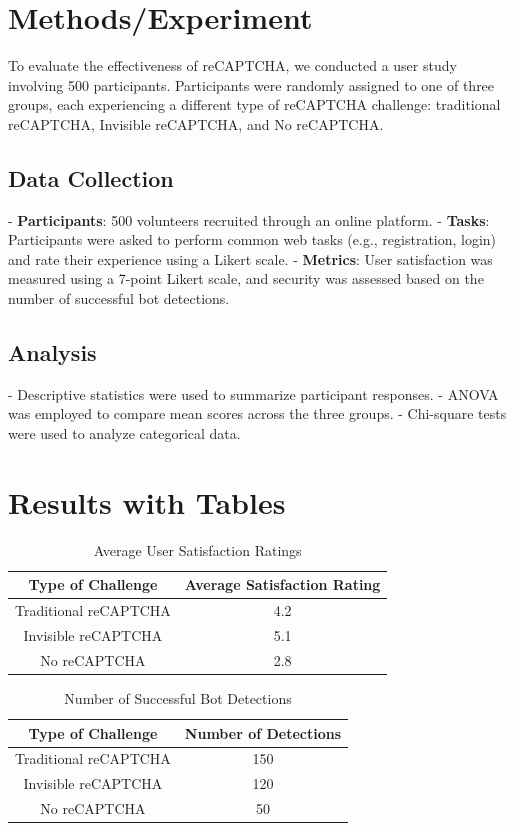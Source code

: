 \section{Methods/Experiment}
To evaluate the effectiveness of reCAPTCHA, we conducted a user study involving 500 participants. Participants were randomly assigned to one of three groups, each experiencing a different type of reCAPTCHA challenge: traditional reCAPTCHA, Invisible reCAPTCHA, and No reCAPTCHA.

\subsection{Data Collection}
- \textbf{Participants}: 500 volunteers recruited through an online platform.
- \textbf{Tasks}: Participants were asked to perform common web tasks (e.g., registration, login) and rate their experience using a Likert scale.
- \textbf{Metrics}: User satisfaction was measured using a 7-point Likert scale, and security was assessed based on the number of successful bot detections.

\subsection{Analysis}
- Descriptive statistics were used to summarize participant responses.
- ANOVA was employed to compare mean scores across the three groups.
- Chi-square tests were used to analyze categorical data.

\section{Results with Tables}
\begin{table}[H]
\centering
\caption{Average User Satisfaction Ratings}
\label{tab:satisfaction}
\begin{tabular}{|c|c|}
\hline
Type of Challenge & Average Satisfaction Rating \\
\hline
Traditional reCAPTCHA & 4.2 \\
Invisible reCAPTCHA & 5.1 \\
No reCAPTCHA & 2.8 \\
\hline
\end{tabular}
\end{table}

\begin{table}[H]
\centering
\caption{Number of Successful Bot Detections}
\label{tab:detections}
\begin{tabular}{|c|c|}
\hline
Type of Challenge & Number of Detections \\
\hline
Traditional reCAPTCHA & 150 \\
Invisible reCAPTCHA & 120 \\
No reCAPTCHA & 50 \\
\hline
\end{tabular}
\end{table}

